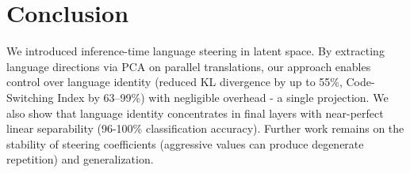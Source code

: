\section{Conclusion}

We introduced inference-time language steering in latent space.
By extracting language directions via PCA on parallel translations, our approach enables control over language identity (reduced KL divergence by up to 55\%, Code-Switching Index by 63--99\%) with negligible overhead - a single projection.
We also show that language identity concentrates in final layers with near-perfect linear separability (96-100\% classification accuracy).
Further work remains on the stability of steering coefficients (aggressive values can produce degenerate repetition) and generalization.
